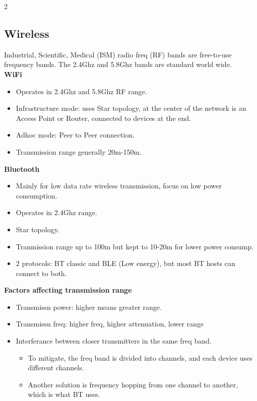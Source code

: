 \documentclass[10pt]{article}
\begin{document}
\begin{multicols}{2}
\subsection*{Wireless}
Industrial, Scientific, Medical (ISM) radio freq (RF) bands are free-to-use frequency bands. The 2.4Ghz and 5.8Ghz bands are standard world wide.\\
\textbf{WiFi}
{}
\begin{itemize}
    \item Operates in 2.4Ghz and 5.8Ghz RF range.
    \item Infrastructure mode: uses Star topology, at the center of the network is an Access Point or Router, connected to devices at the end.
    \item Adhoc mode: Peer to Peer connection.
    \item Transmission range generally 20m-150m.
\end{itemize}
\textbf{Bluetooth}
{}
\begin{itemize}
    \item Mainly for low data rate wireless transmission, focus on low power consumption.
    \item Operates in 2.4Ghz range.
    \item Star topology.
    \item Tranmission range up to 100m but kept to 10-20m for lower power consump.
    \item 2 protocols: BT classic and BLE (Low energy), but most BT hosts can connect to both.
\end{itemize}
\textbf{Factors affecting transmission range}
{}
\begin{itemize}
    \item Transmissn power: higher means greater range.
    \item Transmissn freq: higher freq, higher attenuation, lower range
    \item Interferance between closer transmitters in the same freq band.
    \begin{itemize}
        \item To mitigate, the freq band is divided into channels, and each device uses different channels.
        \item Another solution is frequency hopping from one channel to another, which is what BT uses.
    \end{itemize}
\end{itemize}


\end{multicols}
\end{document}
